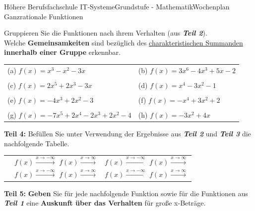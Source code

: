 \documentclass[oneside,openany,headings=optiontotoc,11pt,numbers=noenddot]{scrreprt}
\begin{document}
\begin{worksheet}{Höhere Berufsfachschule IT-Systeme}{Grundstufe - Mathematik}{Wochenplan Ganzrationale Funktionen}
\begin{framed}
			Gruppieren Sie die Funktionen nach ihrem Verhalten (aus \textbf{\textit{Teil 2}}).\\
			Welche \textbf{Gemeinsamkeiten} sind bezüglich des \underline{charakteristischen Summanden} \textbf{innerhalb einer Gruppe} erkennbar.
			\par\noindent
			\begin{tabularx}{\textwidth}{XX}
				(a) \(f(x) = x^3 -x^2 -3x\) & (b) \(f(x) = 3x^6 - 4x^3 + 5x - 2\)\\
				\\
				(c) \(f(x) = 2x^5+2x^3-3x\) & (d) \(f(x) =x^4-3x^2-1\)\\
				\\
				(e) \(f(x) = -4x^3+2x^2-3\) & (f) \(f(x) = -x^4+3x^2+2\)\\
				\\
				(g) \(f(x) = -7x^5+2x^4-2x^3+2x^2-4\) & (h) \(f(x) = -3x^2+4x\)
			\end{tabularx}
		\end{framed}
		\newpage
		\begin{framed}
			\noindent
			\textbf{Teil 4:} Befüllen Sie unter Verwendung der Ergebnisse aus \textbf{\textit{Teil 2}} und \textbf{\textit{Teil 3}} die nachfolgende Tabelle.\\
			\par\noindent
			\begin{tabular}{|l|L{0.4\textwidth}|L{0.4\textwidth}|}
				\hline
				 & & \\
				\hline
				&  & \\
				\hline
				&  & \\
				\hline
			\end{tabular}
		\end{framed}
		\begin{framed}
			\noindent
			\textbf{Teil 5:} \textbf{Geben} Sie für jede nachfolgende Funktion sowie für die Funktionen aus \textbf{\textit{Teil 1}} eine \textbf{Auskunft über das Verhalten} für große x-Beträge.

\end{framed}
\end{worksheet}
\end{document}
